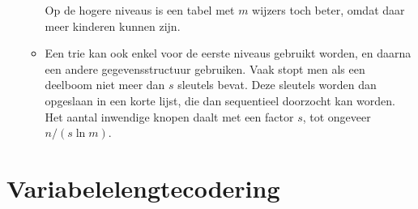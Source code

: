 \begin{itemize}
\begin{itemize}
        Op  de hogere niveaus is een tabel met $m$ wijzers toch beter, omdat daar meer kinderen kunnen zijn.
        \item Een trie kan ook enkel voor de eerste niveaus gebruikt worden, en daarna een andere gegevensstructuur gebruiken. Vaak stopt men als een deelboom niet meer dan $s$ sleutels bevat. Deze sleutels worden dan opgeslaan in een korte lijst, die dan sequentieel doorzocht kan worden. Het aantal inwendige knopen daalt met een factor $s$, tot ongeveer $n/(s \ln m)$.
    \end{itemize}
\end {itemize}

\section{Variabelelengtecodering}
